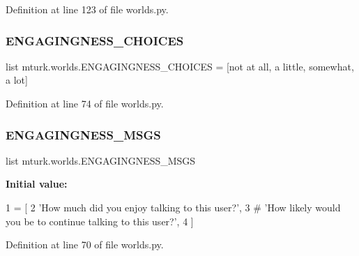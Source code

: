 Definition at line 123 of file worlds.\+py.

\mbox{\label{namespacemturk_1_1worlds_a3b30615ae584ce4de8f4edf2e9dcd598}} 
\subsubsection{\texorpdfstring{E\+N\+G\+A\+G\+I\+N\+G\+N\+E\+S\+S\+\_\+\+C\+H\+O\+I\+C\+ES}{ENGAGINGNESS\_CHOICES}}
{\footnotesize\ttfamily list mturk.\+worlds.\+E\+N\+G\+A\+G\+I\+N\+G\+N\+E\+S\+S\+\_\+\+C\+H\+O\+I\+C\+ES = \mbox{[}\textquotesingle{}not at all\textquotesingle{}, \textquotesingle{}a little\textquotesingle{}, \textquotesingle{}somewhat\textquotesingle{}, \textquotesingle{}a lot\textquotesingle{}\mbox{]}}



Definition at line 74 of file worlds.\+py.

\mbox{\label{namespacemturk_1_1worlds_a6e8aeeab9df9ac2e093095ff4a01ec70}} 
\subsubsection{\texorpdfstring{E\+N\+G\+A\+G\+I\+N\+G\+N\+E\+S\+S\+\_\+\+M\+S\+GS}{ENGAGINGNESS\_MSGS}}
{\footnotesize\ttfamily list mturk.\+worlds.\+E\+N\+G\+A\+G\+I\+N\+G\+N\+E\+S\+S\+\_\+\+M\+S\+GS}

{\bfseries Initial value\+:}
\begin{DoxyCode}
1 =  [
2     \textcolor{stringliteral}{'How much did you enjoy talking to this user?'},
3     \textcolor{comment}{# 'How likely would you be to continue talking to this user?',}
4 ]
\end{DoxyCode}


Definition at line 70 of file worlds.\+py.

